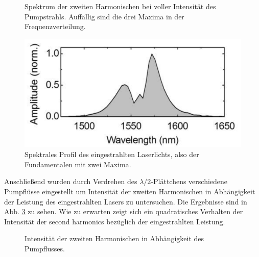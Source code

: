 \pgfplotsset{width=0.6\textwidth,height=4cm,scale only axis=true}
\begin{figure}
  \centering
  \caption{Spektrum der zweiten Harmonischen bei voller Intensität des Pumpstrahls. Auffällig sind die drei Maxima in der Frequenzverteilung.}
  \label{shg_spektrum}
\end{figure}



\begin{figure}[H]
	\begin{center}
		\includegraphics[width=14cm]{Abb/laserprofil.png}
		\caption{Spektrales Profil des eingestrahlten Laserlichts, also der Fundamentalen mit zwei Maxima.}
		\label{laserprofil}
	\end{center}
\end{figure}

Anschließend wurden durch Verdrehen des $\lambda/2$-Plättchens verschiedene Pumpflüsse eingestellt um Intensität der zweiten Harmonischen in Abhängigkeit der Leistung des eingestrahlten Lasers zu untersuchen. Die Ergebnisse sind in Abb. \ref{intensitätmod} zu sehen. Wie zu erwarten zeigt sich ein quadratisches Verhalten der Intensität der second harmonics bezüglich der eingestrahlten Leistung.

\begin{figure}
  \centering
  \caption{Intensität der zweiten Harmonischen in Abhängigkeit des Pumpflusses.}
  \label{intensitätmod}
\end{figure}

